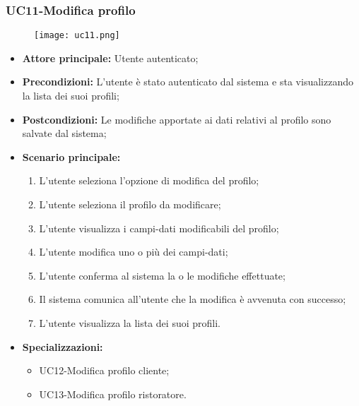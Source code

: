 \subsubsection{UC11-Modifica profilo}
\begin{figure}[h] \texttt{[image: uc11.png]} \end{figure}
\begin{itemize}
\item \textbf{Attore principale:} Utente autenticato;
\item \textbf{Precondizioni:} L'utente è stato autenticato dal sistema e sta visualizzando la lista dei suoi profili;
\item \textbf{Postcondizioni:} Le modifiche apportate ai dati relativi al profilo sono salvate dal sistema;
\item \textbf{Scenario principale:}
\begin{enumerate}
    \item L'utente seleziona l'opzione di modifica del profilo;
    \item L'utente seleziona il profilo da modificare;
    \item L'utente visualizza i campi-dati modificabili del profilo;
    \item L'utente modifica uno o più dei campi-dati;
    \item L'utente conferma al sistema la o le modifiche effettuate;
    \item Il sistema comunica all'utente che la modifica è avvenuta con successo;
    \item L'utente visualizza la lista dei suoi profili.
\end{enumerate}
    \item \textbf{Specializzazioni:}
        \begin{itemize}
            \item UC12-Modifica profilo cliente;
            \item UC13-Modifica profilo ristoratore.
        \end{itemize}
\end{itemize}


